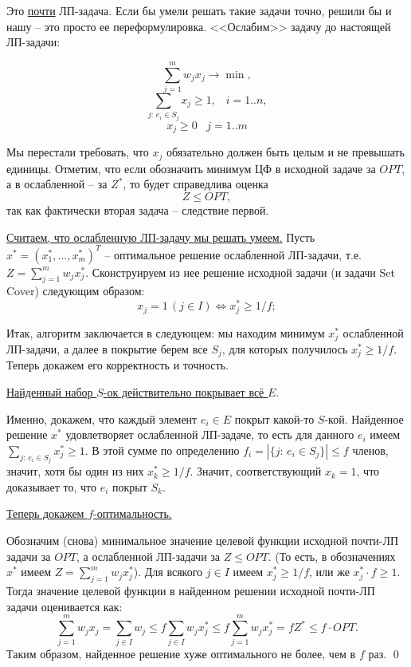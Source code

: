 Это \underline{почти} ЛП-задача. Если бы умели решать такие задачи точно, решили бы и нашу -- это просто ее переформулировка. <<Ослабим>> задачу до настоящей ЛП-задачи:

$$\sum_{j=1}^m w_j x_j \rightarrow \min,$$
$$\sum_{j:\, e_i \in S_j} x_j \geq 1, \;\;\; i=1..n,$$
$$x_j \geq 0 \;\;\; j=1..m$$

Мы перестали требовать, что $x_j$ обязательно должен быть целым и не превышать единицы. Отметим, что если обозначить минимум ЦФ в исходной задаче за $OPT$, а в ослабленной -- за $Z^*$, то будет справедлива оценка $$Z \leq OPT,$$ так как фактически вторая задача -- следствие первой.


\underline{Считаем, что ослабленную ЛП-задачу мы решать умеем.} Пусть $x^* = (x_1^*, ..., x_m^*)^T$ -- оптимальное решение ослабленной ЛП-задачи, т.е. $Z = \sum\limits_{j=1}^m w_j x_j^*$. Сконструируем из нее решение исходной задачи (и задачи Set Cover) следующим образом:
$$x_j = 1\, (j \in I) \iff x_j^* \geq 1/f;$$

Итак, алгоритм заключается в следующем: мы находим минимум $x_j^*$ ослабленной ЛП-задачи, а далее в покрытие берем все $S_j$, для которых получилось $x_j^* \geq 1/f$. Теперь докажем его корректность и точность.

\underline{Найденный набор $S$-ок действительно покрывает всё $E$}.

Именно, докажем, что каждый элемент $e_i \in E$ покрыт какой-то $S$-кой. Найденное решение $x^*$ удовлетворяет ослабленной ЛП-задаче, то есть для данного $e_i$ имеем $\sum\limits_{j: \, e_i \in S_j} x_j^* \geq 1$. В этой сумме по определению $f_i = \left|\{j: \, e_i \in S_j\}\right| \leq f$ членов, значит, хотя бы один из них $x_k^*\geq 1/f$. Значит, соответствующий $x_k = 1$, что доказывает то, что $e_i$ покрыт $S_k$.

\underline{Теперь докажем $f$-оптимальность.} 

Обозначим (снова) минимальное значение целевой функции исходной почти-ЛП задачи за $OPT$, а ослабленной ЛП-задачи за $Z \leq OPT$.  (То есть, в обозначениях $x^*$ имеем $Z = \sum\limits_{j=1}^m w_j x_j^*$). Для всякого $j\in I$ имеем $x_j^* \geq 1/f$, или же $x_j^*\cdot f \geq 1$. Тогда значение целевой функции в найденном решении исходной почти-ЛП задачи оценивается как:
$$\sum_{j=1}^m w_j x_j = \sum_{j \in I} w_j \leq f \sum_{j \in I} w_j x_j^* \leq f \sum_{j=1}^m w_j x_j^* = f Z^* \leq f \cdot OPT.$$ Таким образом, найденное решение хуже оптимального не более, чем в $f$ раз. \qed

